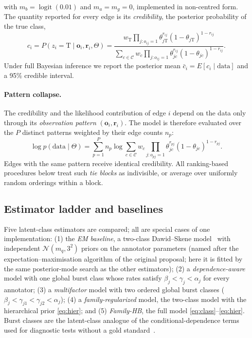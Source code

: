 \documentclass[11pt,a4paper]{article}
\begin{document}
with $m_b=\operatorname{logit}(0.01)$ and $m_a=m_g=0$, implemented in non-centred form.
The quantity reported for every edge is its \emph{credibility}, the posterior probability of the true class,
\begin{equation}
  c_i=P(z_i=\mathrm{T}\mid \mathbf{o}_i,\mathbf{r}_i,\Theta)=
  \frac{w_{\mathrm{T}}\prod_{j:o_{ij}=1}\theta_{j\mathrm{T}}^{r_{ij}}(1-\theta_{j\mathrm{T}})^{1-r_{ij}}}
       {\sum_{c\in\mathcal{C}} w_c\prod_{j:o_{ij}=1}\theta_{jc}^{r_{ij}}(1-\theta_{jc})^{1-r_{ij}}}.
  \label{eq:credibility}
\end{equation}
Under full Bayesian inference we report the posterior mean $\bar c_i=E[c_i\mid\text{data}]$ and a 95\% credible interval.

\paragraph{Pattern collapse.}
The credibility and the likelihood contribution of edge $i$ depend on the data only through its \emph{observation pattern} $(\mathbf{o}_i,\mathbf{r}_i)$. The model is therefore evaluated over the $P$ distinct patterns weighted by their edge counts $n_p$:
\begin{equation}
  \log p(\text{data}\mid\Theta)=\sum_{p=1}^{P} n_p \log\sum_{c\in\mathcal{C}} w_c \prod_{j:o_{pj}=1}\theta_{jc}^{r_{pj}}(1-\theta_{jc})^{1-r_{pj}}.
  \label{eq:collapsed}
\end{equation}
Edges with the same pattern receive identical credibility. All ranking-based procedures below treat such \emph{tie blocks} as indivisible, or average over uniformly random orderings within a block.

\subsection{Estimator ladder and baselines}\label{sec:ladder}
Five latent-class estimators are compared; all are special cases of one implementation:
(1) the \emph{EM baseline}, a two-class Dawid--Skene model~\citep{dawid1979maximum} with independent $\mathcal{N}(m_q,3^2)$ priors on the annotator parameters (named after the expectation--maximisation algorithm of the original proposal; here it is fitted by the same posterior-mode search as the other estimators);
(2) a \emph{dependence-aware} model with one global burst class whose rates satisfy $\beta_j<\gamma_j<\alpha_j$ for every annotator;
(3) a \emph{multifactor} model with two ordered global burst classes ($\beta_j<\gamma_{j1}<\gamma_{j2}<\alpha_j$);
(4) a \emph{family-regularized} model, the two-class model with the hierarchical prior \eqref{eq:hier}; and
(5) \emph{Family-HB}, the full model \eqref{eq:class}--\eqref{eq:hier}.
Burst classes are the latent-class analogue of the conditional-dependence terms used for diagnostic tests without a gold standard~\citep{qu1996random,dendukuri2001bayesian,albert2004cautionary}.
\end{document}

